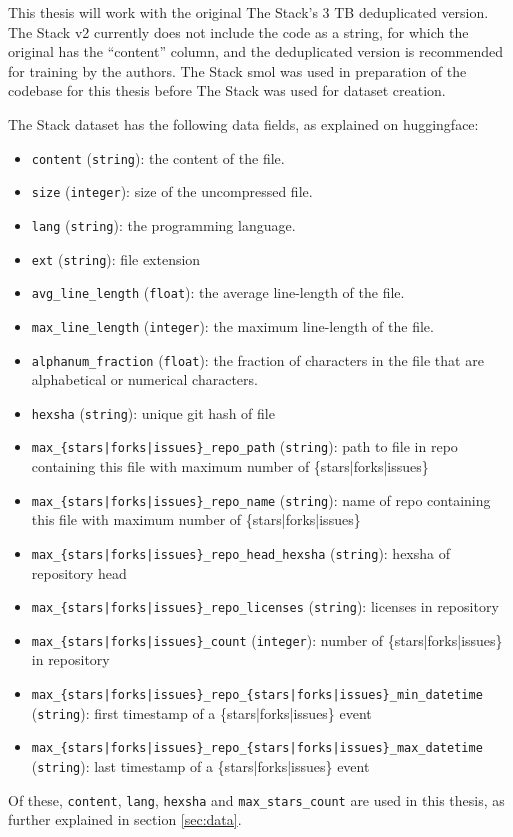 This thesis will work with the original The Stack's 3 TB deduplicated version.
The Stack v2 currently does not include the code as a string, for which the original has the \enquote{content} column, and the deduplicated version is recommended for training by the authors.
The Stack smol was used in preparation of the codebase for this thesis before The Stack was used for dataset creation.

The Stack dataset has the following data fields, as explained on huggingface:
\begin{itemize}
    \item \texttt{content} (\texttt{string}): the content of the file.
    \item \texttt{size} (\texttt{integer}): size of the uncompressed file.
    \item \texttt{lang} (\texttt{string}): the programming language.
    \item \texttt{ext} (\texttt{string}): file extension
    \item \texttt{avg\_line\_length} (\texttt{float}): the average line-length of the file.
    \item \texttt{max\_line\_length} (\texttt{integer}): the maximum line-length of the file.
    \item \texttt{alphanum\_fraction} (\texttt{float}): the fraction of characters in the file that are alphabetical or numerical characters.
    \item \texttt{hexsha} (\texttt{string}): unique git hash of file
    \item \texttt{max\_\{stars|forks|issues\}\_repo\_path} (\texttt{string}): path to file in repo containing this file with maximum number of \{stars|forks|issues\}
    \item \texttt{max\_\{stars|forks|issues\}\_repo\_name} (\texttt{string}): name of repo containing this file with maximum number of \{stars|forks|issues\}
    \item \texttt{max\_\{stars|forks|issues\}\_repo\_head\_hexsha} (\texttt{string}): hexsha of repository head
    \item \texttt{max\_\{stars|forks|issues\}\_repo\_licenses} (\texttt{string}): licenses in repository
    \item \texttt{max\_\{stars|forks|issues\}\_count} (\texttt{integer}): number of \{stars|forks|issues\} in repository
    \item \texttt{max\_\{stars|forks|issues\}\_repo\_\{stars|forks|issues\}\_min\_datetime} \\(\texttt{string}): first timestamp of a \{stars|forks|issues\} event
    \item \texttt{max\_\{stars|forks|issues\}\_repo\_\{stars|forks|issues\}\_max\_datetime} \\(\texttt{string}): last timestamp of a \{stars|forks|issues\} event
\end{itemize}
Of these, \texttt{content}, \texttt{lang}, \texttt{hexsha} and \texttt{max\_stars\_count} are used in this thesis, as further explained in section \ref{sec:data}.

